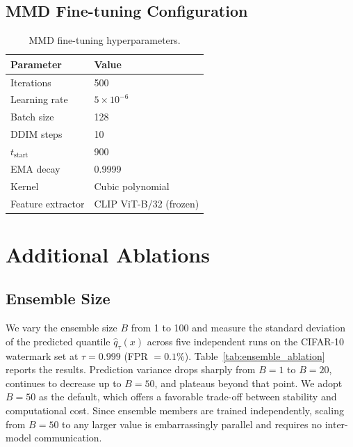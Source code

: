 \documentclass{article}
\begin{document}
\subsection{MMD Fine-tuning Configuration}

\begin{table}[h]
\caption{MMD fine-tuning hyperparameters.}
\begin{center}
\begin{tabular}{ll}
\toprule
Parameter & Value \\
\midrule
Iterations & 500 \\
Learning rate & $5 \times 10^{-6}$ \\
Batch size & 128 \\
DDIM steps & 10 \\
$t_{\text{start}}$ & 900 \\
EMA decay & 0.9999 \\
Kernel & Cubic polynomial \\
Feature extractor & CLIP ViT-B/32 (frozen) \\
\bottomrule
\end{tabular}
\end{center}
\end{table}

\section{Additional Ablations}
\label{app:ablation}

\subsection{Ensemble Size}

We vary the ensemble size $B$ from 1 to 100 and measure the standard deviation of the predicted quantile $\hat{q}_\tau(x)$ across five independent runs on the CIFAR-10 watermark set at $\tau = 0.999$ (FPR $= 0.1\%$). Table~\ref{tab:ensemble_ablation} reports the results. Prediction variance drops sharply from $B = 1$ to $B = 20$, continues to decrease up to $B = 50$, and plateaus beyond that point. We adopt $B = 50$ as the default, which offers a favorable trade-off between stability and computational cost. Since ensemble members are trained independently, scaling from $B = 50$ to any larger value is embarrassingly parallel and requires no inter-model communication.
\end{document}
